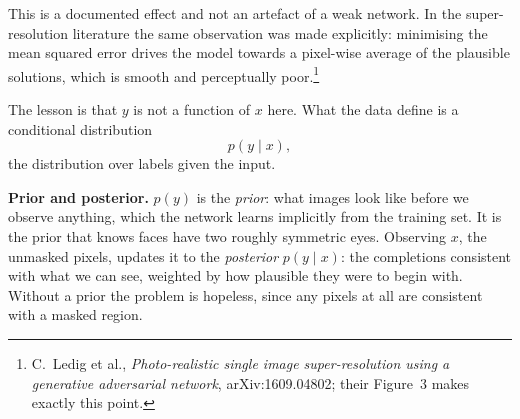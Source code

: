 \documentclass[11pt]{article}
\begin{document}
\begin{minipage}{\textwidth}
\vspace{4pt}
\end{minipage}

\medskip
\noindent
This is a documented effect and not an artefact of a weak network. In the super-resolution
literature the same observation was made explicitly: minimising the mean squared error
drives the model towards a pixel-wise average of the plausible solutions, which is smooth
and perceptually poor.\footnote{C.\ Ledig et al., \emph{Photo-realistic single image
super-resolution using a generative adversarial network}, arXiv:1609.04802; their
Figure~3 makes exactly this point.}

\medskip
\noindent
The lesson is that $y$ is not a function of $x$ here. What the data define is a conditional
distribution
%
\[
  p(y \mid x),
\]
%
the distribution over labels given the input.

\begin{asidebox}
\textbf{Prior and posterior.} $p(y)$ is the \emph{prior}: what images look like before we
observe anything, which the network learns implicitly from the training set. It is the
prior that knows faces have two roughly symmetric eyes. Observing $x$, the unmasked pixels,
updates it to the \emph{posterior} $p(y \mid x)$: the completions consistent with what we
can see, weighted by how plausible they were to begin with. Without a prior the problem is
hopeless, since any pixels at all are consistent with a masked region.
\end{asidebox}
\end{document}
